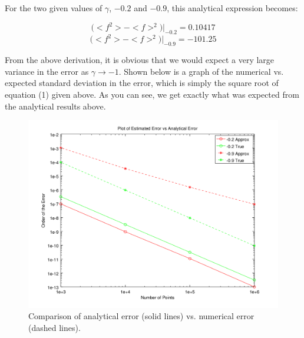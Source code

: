 \documentclass[11pt,a4paper,oneside]{article}
\begin{document}
For the two given values of $\gamma$, $-0.2$ and $-0.9$, this analytical expression becomes:

\begin{equation}
	\big( <f^2> - <f>^2\big) \big|_{-0.2} = 0.10417
\end{equation}
\begin{equation}
	\big( <f^2> - <f>^2\big) \big|_{-0.9} = -101.25
\end{equation}

From the above derivation, it is obvious that we would expect a very large variance in the error
as $\gamma \rightarrow -1$.  Shown below is a graph of the numerical vs. expected standard deviation
in the error, which is simply the square root of equation (1) given above.  As you can see, we get
exactly what was expected from the analytical results above.

\begin{centering}
\begin{figure}[h!]
\includegraphics[width=\textwidth]{untitled.png}
\caption{Comparison of analytical error (solid lines) vs. numerical error (dashed lines).}
\end{figure}
\end{centering}
\end{document}
